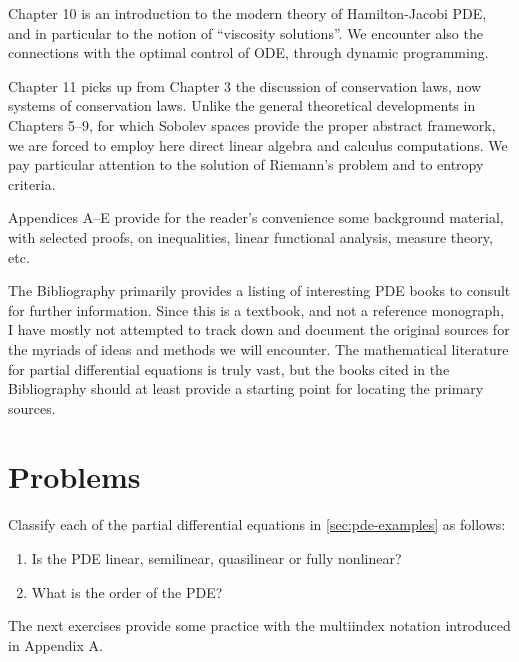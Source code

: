 Chapter 10 is an introduction to the modern theory of Hamilton-Jacobi PDE, and in particular to the notion of ``viscosity solutions''. We encounter also the connections with the optimal control of ODE, through dynamic programming.

Chapter 11 picks up from Chapter 3 the discussion of conservation laws, now systems of conservation laws. Unlike the general theoretical developments in Chapters 5--9, for which Sobolev spaces provide the proper abstract framework, we are forced to employ here direct linear algebra and calculus computations. We pay particular attention to the solution of Riemann's problem and to entropy criteria.

Appendices A--E provide for the reader's convenience some background material, with selected proofs, on inequalities, linear functional analysis, measure theory, etc.

The Bibliography primarily provides a listing of interesting PDE books to consult for further information. Since this is a textbook, and not a reference monograph, I have mostly not attempted to track down and document the original sources for the myriads of ideas and methods we will encounter. The mathematical literature for partial differential equations is truly vast, but the books cited in the Bibliography should at least provide a starting point for locating the primary sources.

\section{Problems}
\label{sec:chapter1-problems}

\begin{exercise}
Classify each of the partial differential equations in \cref{sec:pde-examples} as follows:
\begin{enumerate}
\item[(a)] Is the PDE linear, semilinear, quasilinear or fully nonlinear?
\item[(b)] What is the order of the PDE?
\end{enumerate}
\end{exercise}

The next exercises provide some practice with the multiindex notation introduced in Appendix A.

